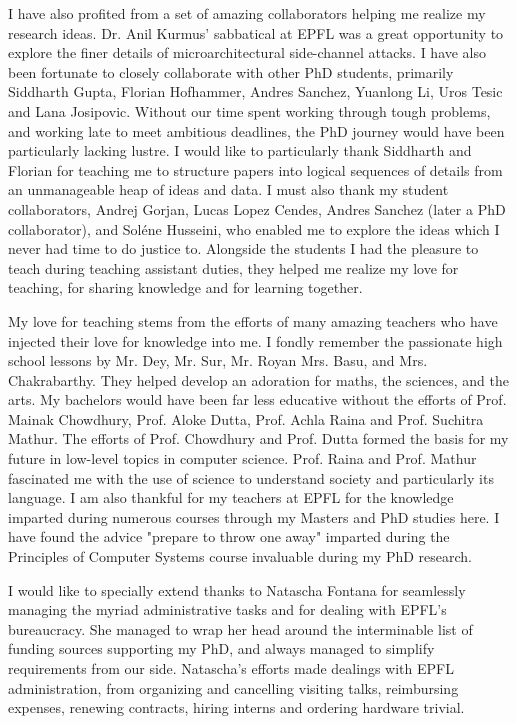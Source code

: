 I have also profited from a set of amazing collaborators helping me realize my
research ideas. 
Dr. Anil Kurmus' sabbatical at EPFL was a great opportunity to explore the
finer details of microarchitectural side-channel attacks.
I have also been fortunate to closely collaborate with other PhD students,
primarily Siddharth Gupta, Florian Hofhammer, Andres Sanchez, Yuanlong Li,
Uros Tesic and Lana Josipovic. 
Without our time spent working through tough problems, and working late to meet
ambitious deadlines, the PhD journey would have been particularly lacking lustre.
I would like to particularly thank Siddharth and Florian for teaching me to
structure papers into logical sequences of details from an unmanageable heap of
ideas and data.
I must also thank my student collaborators, Andrej Gorjan, Lucas Lopez Cendes, 
Andres Sanchez (later a PhD collaborator), and Soléne Husseini, who enabled me to 
explore the ideas which I never had time to do justice to. 
Alongside the students I had the pleasure to teach during teaching assistant
duties, they helped me realize my love for teaching, for sharing knowledge
and for learning together.

My love for teaching stems from the efforts of many amazing teachers who have
injected their love for knowledge into me.
I fondly remember the passionate high school lessons by 
Mr. Dey, Mr. Sur, Mr. Royan Mrs. Basu, and Mrs. Chakrabarthy.
They helped develop an adoration for maths, the sciences, and the arts.
My bachelors would have been far less educative without the efforts 
of Prof. Mainak Chowdhury, Prof. Aloke Dutta, Prof. Achla Raina
and Prof. Suchitra Mathur.
The efforts of Prof. Chowdhury and Prof. Dutta formed the basis for my
future in low-level topics in computer science. 
Prof. Raina and Prof. Mathur fascinated me with the use of science to
understand society and particularly its language.
I am also thankful for my teachers at EPFL for the knowledge imparted during
numerous courses through my Masters and PhD studies here.
I have found the advice "prepare to throw one away" imparted during the
Principles of Computer Systems course invaluable during my
PhD research.

I would like to specially extend thanks to Natascha Fontana for seamlessly 
managing the myriad administrative tasks and for dealing with EPFL's bureaucracy.
She managed to wrap her head around the interminable list of funding sources
supporting my PhD, and always managed to simplify requirements from our side.
Natascha's efforts made dealings with EPFL administration, from organizing and
cancelling visiting talks, reimbursing expenses, renewing contracts, 
hiring interns and ordering hardware trivial.

